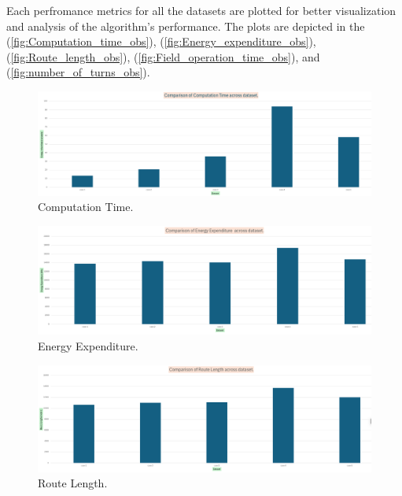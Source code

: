 Each perfromance metrics for all the datasets are plotted for better visualization and analysis of the algorithm's performance. The plots are depicted in the (\autoref{fig:Computation_time_obs}), (\autoref{fig:Energy_expenditure_obs}), (\autoref{fig:Route_length_obs}), (\autoref{fig:Field_operation_time_obs}), and (\autoref{fig:number_of_turns_obs}).


\begin{figure}[H]
    \centering
    \includegraphics[width=\textwidth]{Images/plots/obs/computation_time.png}
    \caption{Computation Time.}
    \label{fig:Computation_time_obs}
\end{figure}

\begin{figure}[H]
    \centering
    \includegraphics[width=\textwidth]{Images/plots/obs/Energy.png}
    \caption{Energy Expenditure.}
    \label{fig:Energy_expenditure_obs}
\end{figure}

\begin{figure}[H]
    \centering
    \includegraphics[width=\textwidth]{Images/plots/obs/route_length.png}
    \caption{Route Length.}
    \label{fig:Route_length_obs}
\end{figure}

